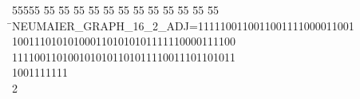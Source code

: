 %
%
\begin{tabbing}
55555 \= 55 \= 55 \= 55 \= 55 \= 55 \= 55 \= 55 \= 55 \= 55 \= 55 \= 55 \= 55 \= \>NEUMAIER\_GRAPH\_16\_2\_ADJ=1111100110011001111000011001\\[0pt]
1001110101010001101010101111110000111100\\[0pt]
\>1111001101001010101101011110011101101011\\[0pt]
1001111111\\[0pt]
2\>\end{tabbing}
